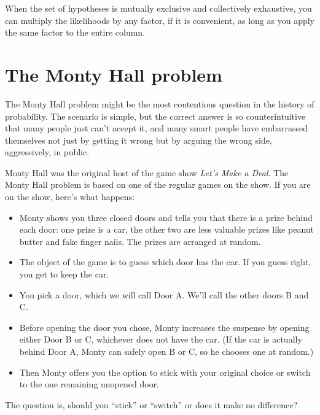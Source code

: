 \documentclass[12pt]{book}
\begin{document}
When the set of hypotheses is mutually exclusive and collectively
exhaustive, you can multiply the likelihoods by any factor, if it is
convenient, as long as you apply the same factor to the entire column.


\section{The Monty Hall problem}

The Monty Hall problem might be the most contentious question in
the history of probability.  The scenario is simple, but the correct
answer is so counterintuitive that many people just can't accept
it, and many smart people have embarrassed themselves not just by
getting it wrong but by arguing the wrong side, aggressively,
in public.

Monty Hall was the original host of the game show {\em Let's Make a
Deal}.  The Monty Hall problem is based on one of the regular
games on the show.  If you are on the show, here's what happens:

\begin{itemize}

\item Monty shows you three closed doors and tells you that there is a
  prize behind each door: one prize is a car, the other two are less
  valuable prizes like peanut butter and fake finger nails.  The
  prizes are arranged at random.

\item The object of the game is to guess which door has the car.  If
  you guess right, you get to keep the car.

\item You pick a door, which we will call Door A.  We'll call the
  other doors B and C.

\item Before opening the door you chose, Monty increases the
  suspense by opening either Door B or C, whichever does not
  have the car.  (If the car is actually behind Door A, Monty can
  safely open B or C, so he chooses one at random.)

\item Then Monty offers you the option to stick with your original
  choice or switch to the one remaining unopened door.

\end{itemize}

The question is, should you ``stick'' or ``switch'' or does it
make no difference?
\end{document}
